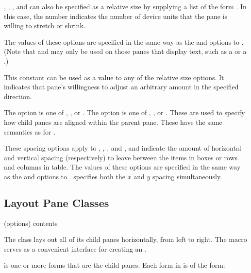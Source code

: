 , , , and  can
also be specified as a relative size by supplying a list of the form
.  In this case, the number indicates the number
of device units that the pane is willing to stretch or shrink.

The values of these options are specified in the same way as the 
and  options to .  (Note that
 and  may only be used on those panes that display
text, such as a  or a .)


This constant can be used as a value to any of the relative size options.  It
indicates that pane's willingness to adjust an arbitrary amount in the specified
direction.


The  option is one of , , or .
The  option is one of , , or .
These are used to specify how child panes are aligned within the parent pane.
These have the same semantics as for .


These spacing options apply to , , ,
and , and indicate the amount of horizontal and vertical spacing
(respectively) to leave between the items in boxes or rows and columns in table.
The values of these options are specified in the same way as the 
and  options to .   specifies
both the $x$ and $y$ spacing simultaneously.


\subsection {Layout Pane Classes}

 {(\rest options) \body contents}

The  class lays out all of its child panes horizontally, from left
to right.  The  macro serves as a convenient interface for
creating an .

 is one or more forms that are the child panes.  Each form in
 is of the form:


